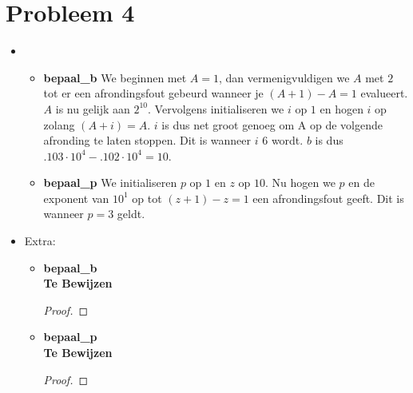 \documentclass[12pt,a4paper]{article}
\begin{document}
\section{Probleem 4}
\begin{itemize}
\item
\begin{itemize}
\item \textbf{bepaal\_b}
We beginnen met $A=1$, dan vermenigvuldigen we $A$ met $2$ tot er een afrondingsfout gebeurd wanneer je $(A+1)-A=1$ evalueert. 
$A$ is nu gelijk aan $2^{10}$. Vervolgens initialiseren we $i$ op $1$ en hogen $i$ op zolang $(A+i)=A$. $i$ is dus net groot genoeg om A op de volgende afronding te laten stoppen. Dit is wanneer $i$ $6$ wordt. $b$ is dus $.103\cdot 10^4-.102\cdot 10^4=10$.
\item \textbf{bepaal\_p}
We initialiseren $p$ op $1$ en $z$ op $10$. Nu hogen we $p$ en de exponent van $10^1$ op tot $(z+1)-z=1$ een afrondingsfout geeft.
Dit is wanneer $p=3$ geldt. 
\end{itemize}
\item
Extra:
\begin{itemize}
\item \textbf{bepaal\_b}\\
\textbf{Te Bewijzen}
\begin{proof}
\end{proof}
\item \textbf{bepaal\_p}\\
\textbf{Te Bewijzen}
\begin{proof}
\end{proof}
\end{itemize}
\end{itemize}
\end{document}
